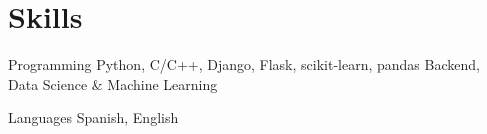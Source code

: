 
\section{Skills}
  \cvitemwithcomment
    {Programming} %
    {Python, C/C++, Django, Flask, scikit-learn, pandas} %
    {Backend, Data Science \& Machine Learning}

  \cvitemwithcomment
    {Languages} %
    {Spanish, English} %
    {}

